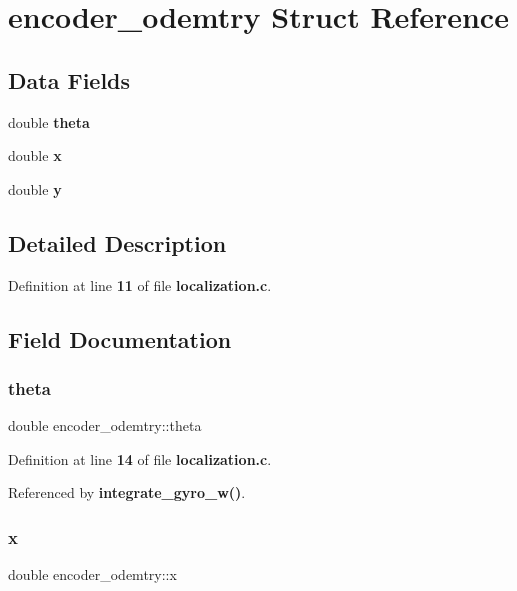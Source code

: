 \section{encoder\+\_\+odemtry Struct Reference}
\label{structencoder__odemtry}
\subsection*{Data Fields}
\begin{DoxyCompactItemize}
\item 
double \textbf{ theta}
\item 
double \textbf{ x}
\item 
double \textbf{ y}
\end{DoxyCompactItemize}


\subsection{Detailed Description}


Definition at line \textbf{ 11} of file \textbf{ localization.\+c}.



\subsection{Field Documentation}
\mbox{\label{structencoder__odemtry_af1a1e2a2a7a2f89138a8c261a3b82898}} 
\subsubsection{theta}
{\footnotesize\ttfamily double encoder\+\_\+odemtry\+::theta}



Definition at line \textbf{ 14} of file \textbf{ localization.\+c}.



Referenced by \textbf{ integrate\+\_\+gyro\+\_\+w()}.

\mbox{\label{structencoder__odemtry_a9a803978381f9b89a031d520a627cbcf}} 
\subsubsection{x}
{\footnotesize\ttfamily double encoder\+\_\+odemtry\+::x}



